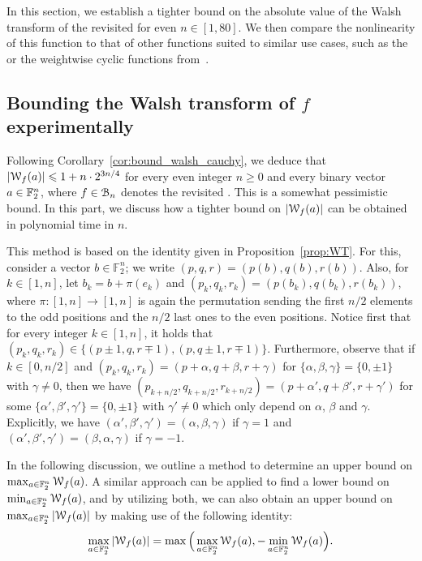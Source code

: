 \documentclass{llncs}
\begin{document}
In this section, we establish a tighter bound on the absolute value of the Walsh transform of the revisited \hwbf{} for even $n\in[1,80]$. We then compare the nonlinearity of this function to that of other functions suited to similar use cases, such as the \hwbf{} or the weightwise cyclic functions from~\cite{DAM:MeaOza24}.

\subsection{Bounding the Walsh transform of $f$ experimentally}\label{sec:expwt}

Following Corollary~\ref{cor:bound_walsh_cauchy}, we deduce that $|\mathcal W_{f}(a)|\leqslant 1+n\cdot 2^{3n/4}$ for every even integer $n\geq 0$ and every binary vector $a\in\mathbb{F}_2^n$, where $f\in\mathcal{B}_n$ denotes the revisited \hwbf{}. This is a somewhat pessimistic bound. In this part, we discuss how a tighter bound on $|\mathcal W_{f}(a)|$ can be obtained in polynomial time in $n$.

This method is based on the identity given in Proposition~\ref{prop:WT}.
For this, consider a vector $b\in\mathbb F_2^n$; we write $(p,q,r)=(p(b),q(b),r(b))$. Also, for $k\in[1,n]$, let $b_k=b+\pi(e_k)$ and $(p_k,q_k,r_k)=(p(b_k),q(b_k),r(b_k))$, where $\pi:[1,n]\to[1,n]$ is again the permutation sending the first $n/2$ elements to the odd positions and the $n/2$ last ones to the even positions. Notice first that for every integer $k\in[1,n]$, it holds that $(p_k,q_k,r_k)\in\{(p\pm1,q,r\mp 1),(p,q\pm 1,r\mp 1)\}$. Furthermore, observe that if $k\in[0,n/2]$ and $(p_k,q_k,r_k)=(p+\alpha,q+\beta,r+\gamma)$ for $\{\alpha,\beta,\gamma\}=\{0,\pm 1\}$ with $\gamma\neq 0$, then we have $(p_{k+n/2},q_{k+n/2},r_{k+n/2})=(p+\alpha',q+\beta',r+\gamma')$ for some $\{\alpha',\beta',\gamma'\}=\{0,\pm 1\}$ with $\gamma'\neq 0$ which only depend on $\alpha$, $\beta$ and $\gamma$. Explicitly, we have $(\alpha',\beta',\gamma')=(\alpha,\beta,\gamma)$ if $\gamma=1$ and $(\alpha',\beta',\gamma')=(\beta,\alpha,\gamma)$ if $\gamma=-1$.

In the following discussion, we outline a method to determine an upper bound on $\max_{a\in\mathbb{F}_2^n}\mathcal W_{f}(a)$. A similar approach can be applied to find a lower bound on $\min_{a\in\mathbb{F}_2^n}\mathcal W_{f}(a)$, and by utilizing both, we can also obtain an upper bound on $\max_{a\in\mathbb{F}_2^n}|\mathcal W_{f}(a)|$ by making use of the following identity:
\[
	\max_{a\in\mathbb{F}_2^n}|\mathcal W_{f}(a)|=\max\Big(\max_{a\in\mathbb{F}_2^n}\mathcal W_{f}(a),-\min_{a\in\mathbb{F}_2^n}\mathcal W_{f}(a)\Big).
\]
\end{document}
